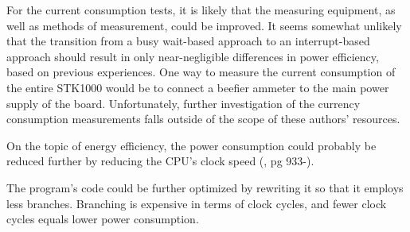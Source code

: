 For the current consumption tests, it is likely that the measuring equipment, as well as methods of measurement, could be improved.
It seems somewhat unlikely that the transition from a busy wait-based approach to an interrupt-based approach should result in only near-negligible differences in power efficiency, based on previous experiences.
One way to measure the current consumption of the entire STK1000 would be to connect a beefier ammeter to the main power supply of the board.
Unfortunately, further investigation of the currency consumption measurements falls outside of the scope of these authors' resources.

On the topic of energy efficiency, the power consumption could probably be reduced further by reducing the CPU's clock speed (\cite{AT32AP7000-prelim}, pg 933-).

The program's code could be further optimized by rewriting it so that it employs less branches. Branching is expensive in terms of clock cycles, and fewer clock cycles equals lower power consumption.
